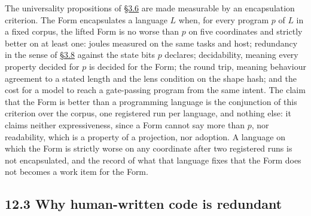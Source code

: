 \documentclass[10pt,letterpaper]{article}
\begin{document}
The universality propositions of
\href{https://research.openie.dev/papers/rce/\#36-one-ecosystem-lossless-and-the-universality-thesis}{§3.6}
are made measurable by an encapsulation criterion. The Form encapsulates
a language \(L\) when, for every program \(p\) of \(L\) in a fixed
corpus, the lifted Form is no worse than \(p\) on five coordinates and
strictly better on at least one: joules measured on the same tasks and
host; redundancy in the sense of
\href{https://research.openie.dev/papers/rce/\#38-behaviour-equivalence-and-dimension}{§3.8}
against the state bits \(p\) declares; decidability, meaning every
property decided for \(p\) is decided for the Form; the round trip,
meaning behaviour agreement to a stated length and the lens condition on
the shape hash; and the cost for a model to reach a gate-passing program
from the same intent. The claim that the Form is better than a
programming language is the conjunction of this criterion over the
corpus, one registered run per language, and nothing else: it claims
neither expressiveness, since a Form cannot say more than \(p\), nor
readability, which is a property of a projection, nor adoption. A
language on which the Form is strictly worse on any coordinate after two
registered runs is not encapsulated, and the record of what that
language fixes that the Form does not becomes a work item for the Form.

\subsection{12.3 Why human-written code is
redundant}\label{why-human-written-code-is-redundant}
\end{document}
